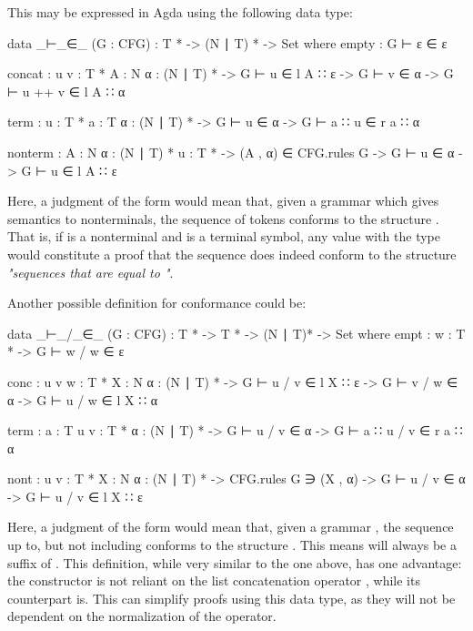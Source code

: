 	This may be expressed in Agda using the following data type:
	
	\begin{code}
	
		data _⊢_∈_ (G : CFG) :  T * -> (N ∣ T) * -> Set where
		  empty :
		    G ⊢ ε ∈ ε
		
		  concat : {u v : T *} {A : N} {α : (N ∣ T) *} ->
		    G ⊢ u ∈ l A ∷ ε -> G ⊢ v ∈ α -> G ⊢ u ++ v ∈ l A ∷ α
		
		  term : {u : T *} {a : T} {α : (N ∣ T) *} ->
		    G ⊢ u ∈ α -> G ⊢ a ∷ u ∈ r a ∷ α
		
		  nonterm : {A : N} {α : (N ∣ T) *} {u : T *} ->
		    (A , α) ∈ CFG.rules G -> G ⊢ u ∈ α -> G ⊢ u ∈ l A ∷ ε

	\end{code}

	Here, a judgment of the form  would mean that, given a
	grammar  which gives semantics to nonterminals, the sequence of
	tokens  conforms to the structure . That is, if
	 is a nonterminal and  is a terminal symbol, any value
	with the type  would constitute a proof
	that the sequence  does indeed conform to the structure
	\emph{"sequences that are equal to "}.

	Another possible definition for conformance could be: 

	\begin{code}
	
		data _⊢_/_∈_ (G : CFG) : T * -> T * -> (N ∣ T)* -> Set where
		  empt : {w : T *} ->
		    G ⊢ w / w ∈ ε
		
		  conc : {u v w : T *} {X : N} {α : (N ∣ T) *} ->
		    G ⊢ u / v ∈ l X ∷ ε ->
		    G ⊢ v / w ∈ α ->
		      G ⊢ u / w ∈ l X ∷ α
		
		  term : {a : T} {u v : T *} {α : (N ∣ T) *} ->
		    G ⊢ u / v ∈ α ->
		      G ⊢ a ∷ u / v ∈ r a ∷ α
		
		  nont : {u v : T *} {X : N} {α : (N ∣ T) *} ->
		    CFG.rules G ∋ (X , α) ->
		    G ⊢ u / v ∈ α ->
		    G ⊢ u / v ∈ l X ∷ ε

	\end{code}

	Here, a judgment of the form  would mean that, given
	a grammar , the sequence  up to, but not including
	 conforms to the structure . This means  will
	always be a suffix of . This definition, while very similar to
	the one above, has one advantage: the constructor  is not
	reliant on the list concatenation operator \codett{++}, while its
	counterpart  is. This can simplify proofs using this data
	type, as they will not be dependent on the normalization of the \codett{++}
	operator.

